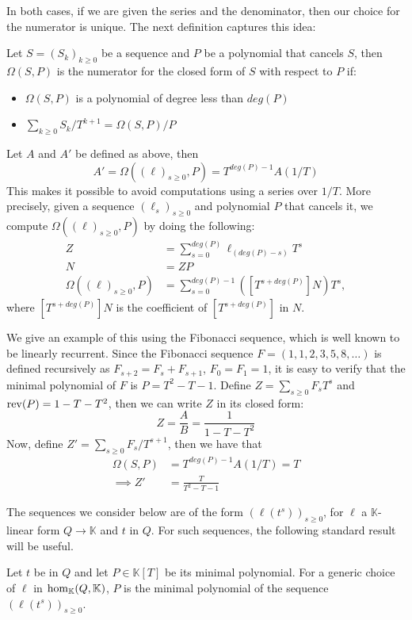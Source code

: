 \documentclass[12pt]{article}
\def\K {\ensuremath{\mathbb{K}}}
\def\K{\mathbb{K}}
\begin{document}
In both cases, if we are given the series and the denominator, then our 
choice for the numerator is unique. The next definition captures this idea:
\begin{definition}
	\label{def:omega}
	Let $S=(S_k)_{k \ge 0}$ be a sequence and $P$ be a polynomial that cancels
	$S$, then $\Omega(S,P)$ is the numerator for the closed form of $S$ with 
	respect to $P$ if:
	\begin{itemize}
		\item $\Omega(S,P)$ is a polynomial of degree less than $deg(P)$
		\item $\sum_{k\ge0} S_k / T^{k+1} = \Omega(S,P)/P$
	\end{itemize}
\end{definition}
\noindent 
Let $A$ and $A'$ be defined as above, then
$$A' = \Omega((\ell)_{s\ge0},P) = T^{deg(P) - 1} A (1/T)$$ 
\noindent This makes it possible to avoid computations using a series
over $1/T$. More precisely, given a sequence $(\ell_s)_{s\ge0}$ and polynomial
$P$ that cancels it, we compute $\Omega((\ell)_{s\ge0},P)$ by doing the following:
\begin{align*}
	Z &= \sum_{s=0}^{deg(P)} \ell_{(deg(P) - s)} T^s\\
	N &= ZP \\
 	\Omega((\ell)_{s\ge0},P) &= \sum_{s = 0}^{deg(P)-1} ([T^{s+deg(P)}] N) T^s,
\end{align*}
where $[T^{s+deg(P)}] N$ is the coefficient of $[T^{s+deg(P)}]$ in $N$.

We give an example of this using
the Fibonacci sequence, which is well known to be linearly recurrent. Since 
the Fibonacci sequence $F = (1,1,2,3,5,8,\dots)$ is defined
recursively as $F_{s+2} = F_{s} + F_{s+1}$, $F_{0}=F_{1} = 1$, it is
easy to verify that the minimal polynomial of $F$ is $P = T^2-T-1$.
Define $Z = \sum_{s\ge 0} F_{s} T^s$ and ${\rm rev}(P) = 1-T-T^2$, then
we can write $Z$ in its closed form:
$$Z = \frac{A}{B} = \frac{1}{1-T-T^2}$$
\noindent Now, define $Z' = \sum_{s\ge0} F_{s}/T^{s+1}$, then we have that
\begin{align*}
\Omega(S,P)& = T^{deg(P)-1}A(1/T) = T\\
\implies Z' &= \frac{T}{T^2-T-1}
\end{align*}

The sequences we consider below are of the form $(\ell(t^s))_{s \ge
	0}$, for $\ell$ a $\K$-linear form $Q \to \K$ and $t$ in $Q$. For such
sequences, the following standard result will be useful.
\begin{lemma}\label{lemma:minpoly}
	Let $t$ be in $Q$ and let $P \in \K[T]$ be its minimal
	polynomial. For a generic choice of $\ell$ in ${\rm hom}_\K(Q,\K)$,
	$P$ is the minimal polynomial of the sequence $(\ell(t^s))_{s \ge
		0}$.
\end{lemma}
\end{document}
